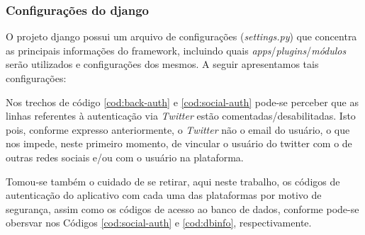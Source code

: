 \subsubsection{Configurações do \gls{django}}
O projeto django possui um arquivo de configurações (\textit{settings.py}) que concentra as principais informações do framework, incluindo quais \textit{apps}/\textit{plugins}/\textit{módulos} serão utilizados e configurações dos mesmos.
A seguir apresentamos tais configurações:






\clearpage




Nos trechos de código \ref{cod:back-auth} e \ref{cod:social-auth} pode-se perceber que as linhas referentes à autenticação via \textit{Twitter} estão comentadas/desabilitadas. Isto pois, conforme expresso anteriormente, o \textit{Twitter} não o email do usuário, o que nos impede, neste primeiro momento, de vincular o usuário do twitter com o de outras redes sociais e/ou com o usuário na plataforma.

Tomou-se também o cuidado de se retirar, aqui neste trabalho, os códigos de autenticação do aplicativo com cada uma das plataformas por motivo de segurança, assim como os códigos de acesso ao banco de dados, conforme pode-se obersvar nos Códigos \ref{cod:social-auth} e \ref{cod:dbinfo}, respectivamente.

